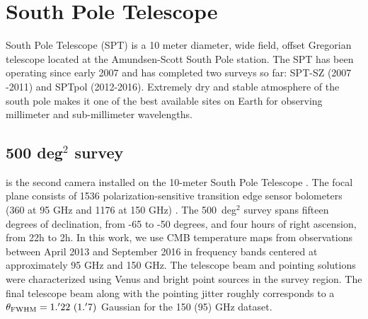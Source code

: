 \section{South Pole Telescope}
\label{sec_SPT}
South Pole Telescope (SPT) is a 10 meter diameter, wide field, offset Gregorian telescope \citep[SPT,][]{padin08, carlstrom11} located at the Amundsen-Scott South Pole station.
The SPT has been operating since early 2007 and has completed two surveys so far: SPT-SZ (2007 -2011) and SPTpol (2012-2016).  
Extremely dry and stable atmosphere of the south pole makes it one of the best available sites on Earth for observing millimeter and sub-millimeter wavelengths. 

\subsection{\sptpol{} {\rm 500} deg$^{2}$ survey}\label{sec_sptpol}
\sptpol{} is the second camera installed on the \mbox{10-meter} South Pole Telescope \citep[SPT,][]{padin08, carlstrom11}.
The \sptpol{} focal plane consists of 1536 polarization-sensitive transition edge sensor bolometers (360 at 95 GHz and 1176 at 150 GHz) \citep{austermann12}.
The \sptpol{} 500~deg$^{2}$ survey spans fifteen degrees of declination, from -65 to -50 degrees, and four hours of right ascension, from 22h to 2h. 
In this work, we use CMB temperature maps from observations between April 2013 and September 2016 in frequency bands centered at approximately 95 GHz and 150 GHz. 
The telescope beam and pointing solutions were characterized using Venus and bright point sources in the \sptpol{} survey region. 
The final telescope beam along with the pointing jitter roughly corresponds to a $\theta_{\rm FWHM} = 1.^{\prime}22\ (1.^{\prime}7)$ Gaussian for the 150 (95) GHz dataset.


